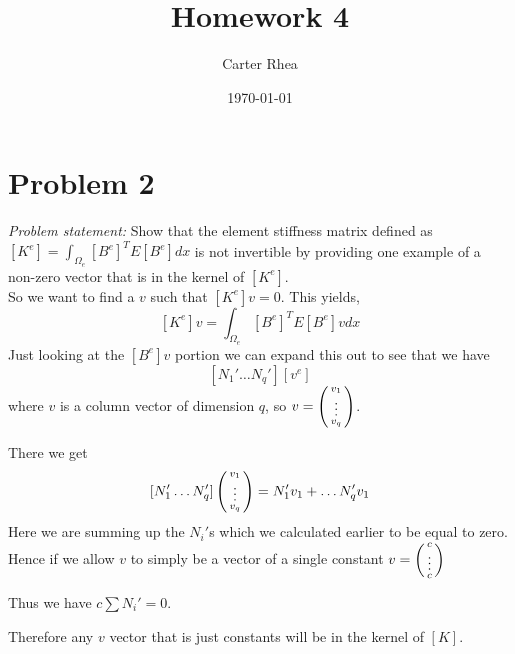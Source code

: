 \documentclass[11pt]{amsart}
\title{Homework 4}
\author{Carter Rhea}
\date{\today}                                           %
\newcommand{\icol}[1]{%
  \left(\begin{smallmatrix}#1\end{smallmatrix}\right)%
}
\begin{document}
\maketitle
\section{Problem 2}
\textit{Problem statement:} Show that the element stiffness matrix defined as $[K^e]=\int_{\Omega_e }[B^e]^TE[B^e]dx $ is not invertible by providing one example of a non-zero vector that is in the kernel of $[K^e]$.
\\

So we want to find a ${v}$ such that $[K^e]{v}=0$. This yields, 
$$[K^e]{v}=\int_{\Omega_e }[B^e]^TE[B^e]{v}dx  $$ 
Just looking at the $[B^e]v$ portion we can expand this out to see that we have
$$[N_1' \dots N_q'][v^e] $$
where $v$ is a column vector of dimension $q$, so $v=\icol{v_1 \\  \vdotswithin{}\\ v_q}$.

There we get 
$$[N_1' \dots N_q']\icol{v_1 \\  \vdotswithin{}\\ v_q} =  N_1'v_1 + \dots N_q'v_1$$
Here we are summing up the $N_i'$s which we calculated earlier to be equal to zero.
Hence if we allow $v$ to simply be a vector of a single constant $v=\icol{c \\  \vdotswithin{}\\ c}$

Thus we have $c\sum{N_i'} = 0$.

Therefore any $v$ vector that is just constants will be in the kernel of $[K]$.
\end{document}
